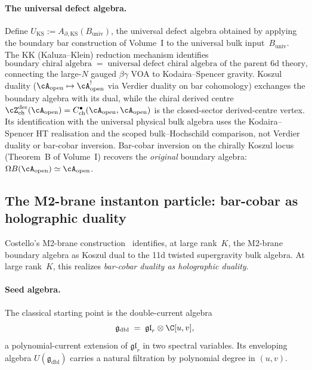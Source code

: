 \paragraph{The universal defect algebra.}
Define $U_{\mathrm{KS}} := A_{\partial,\mathrm{KS}}(B_{\mathrm{univ}})$, the
universal defect algebra obtained by applying the boundary
bar construction of Volume~I to the universal bulk input~$B_{\mathrm{univ}}$.
The KK (Kaluza--Klein) reduction mechanism identifies
\[
 \text{boundary chiral algebra}
 \;=\;
 \text{universal defect chiral algebra of the parent 6d theory},
\]
connecting the large-$N$ gauged $\beta\gamma$ VOA
to Kodaira--Spencer gravity. Koszul duality
($\cA_{\mathrm{open}} \mapsto \cA^!_{\mathrm{open}}$
via Verdier duality on bar cohomology) exchanges the
boundary algebra with its dual, while the chiral derived
centre $\cZ^{\mathrm{der}}_{\mathrm{ch}}(\cA_{\mathrm{open}})
= C^\bullet_{\mathrm{ch}}(\cA_{\mathrm{open}},
\cA_{\mathrm{open}})$ is the closed-sector derived-centre vertex.
Its identification with the universal physical bulk algebra uses the
Kodaira--Spencer HT realisation and the scoped bulk--Hochschild
comparison, not Verdier duality or bar-cobar inversion.
Bar-cobar inversion on the chirally Koszul locus
\textup{(}Theorem~B of Volume~I\textup{)} recovers the
\emph{original} boundary algebra:
$\Omega B(\cA_{\mathrm{open}}) \simeq \cA_{\mathrm{open}}$.

\subsection{The M2-brane instanton particle: bar-cobar as holographic duality}
\label{subsec:M2-holography}

Costello's M2-brane construction~\cite{Costello-1705.02500v1,costello-gaiotto}
identifies, at large rank~$K$, the M2-brane boundary algebra
as Koszul dual to the 11d twisted supergravity bulk algebra.
At large rank~$K$, this realizes \emph{bar-cobar duality as holographic duality}.

\paragraph{Seed algebra.}
The classical starting point is the double-current algebra
\[
 \mathfrak{g}_{\mathrm{dbl}}
 \;=\; \mathfrak{gl}_r \otimes \C[u,v],
\]
a polynomial-current extension of $\mathfrak{gl}_r$ in two spectral variables.
Its enveloping algebra $U(\mathfrak{g}_{\mathrm{dbl}})$ carries a natural
filtration by polynomial degree in $(u,v)$.

